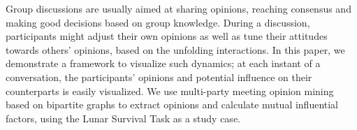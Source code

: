 Group discussions are usually aimed at sharing opinions, reaching consensus and making good decisions based on group knowledge. During a discussion, participants might adjust their own opinions as well as tune their attitudes towards others' opinions, based on the unfolding interactions. In this paper, we demonstrate a framework to visualize such dynamics; at each instant of a conversation, the participants' opinions and potential influence on their counterparts is easily visualized.  We use multi-party meeting opinion mining based on bipartite graphs to extract opinions and calculate mutual influential factors, using the Lunar Survival Task as a study case.
